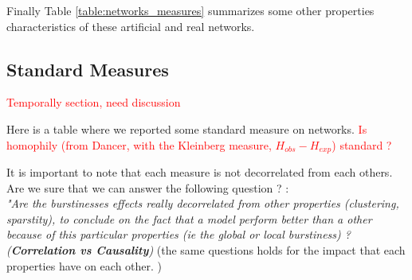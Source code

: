 \documentclass[a4paper, 12pt]{article}
\begin{document}
Finally Table \ref{table:networks_measures} summarizes some other properties characteristics of these artificial and real networks. 

\subsection{Standard Measures}
\textcolor{red}{Temporally section, need discussion}

Here is a  table where we reported  some standard measure on networks. 
\textcolor{red}{ Is homophily (from Dancer, with the Kleinberg measure, $H_{obs} - H_{exp}$)  standard ? }

It is important to note that each measure is not decorrelated from each others. Are we sure that we can answer the following question ? : ~\\

\hspace{1cm}\textit{"Are the burstinesses effects really decorrelated from other properties (clustering, sparstity), to conclude on the fact that a model perform better than a other because of this particular properties (ie the global or local burstiness) ? (\textbf{Correlation \emph{vs} Causality}) } (the same questions holds for the impact that each properties have on each other. ) 

\begin{table}[h] 
\centering
	\caption{table:Networks standard measure on datasets.}
\label{table:networks_measures}
\end{table}
\end{document}

